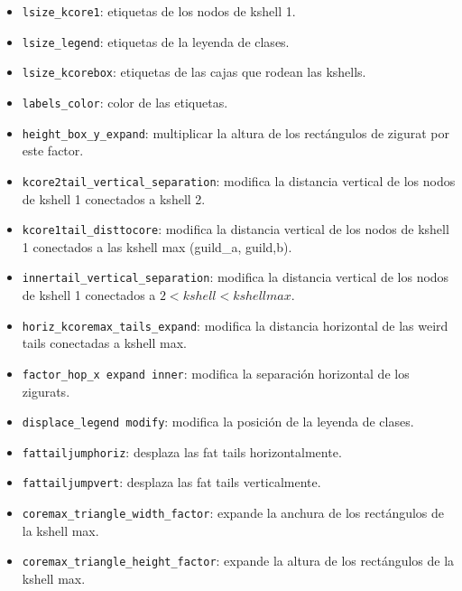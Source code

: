 \begin{itemize}
\item \texttt{lsize\_kcore1}: etiquetas de los nodos de kshell 1.

\item \texttt{lsize\_legend}: etiquetas de la leyenda de clases.

\item \texttt{lsize\_kcorebox}: etiquetas de las cajas que rodean las kshells.

\item \texttt{labels\_color}: color de las etiquetas.

\item \texttt{height\_box\_y\_expand}: multiplicar la altura de los rectángulos de zigurat por este factor.

\item \texttt{kcore2tail\_vertical\_separation}: modifica la distancia vertical de los nodos de kshell 1 conectados a kshell 2.

\item \texttt{kcore1tail\_disttocore}:  modifica la distancia vertical de los nodos de kshell 1 conectados a las kshell max (guild\_a, guild,b).

\item \texttt{innertail\_vertical\_separation}: modifica la distancia vertical de los nodos de kshell 1 conectados a $2 < kshell < kshell max$.

\item \texttt{horiz\_kcoremax\_tails\_expand}: modifica la distancia horizontal de las weird tails conectadas a kshell max.

\item \texttt{factor\_hop\_x expand inner}: modifica la separación horizontal de los zigurats.

\item \texttt{displace\_legend modify}: modifica la posición de la leyenda de clases.

\item \texttt{fattailjumphoriz}: desplaza las fat tails horizontalmente.

\item \texttt{fattailjumpvert}: desplaza las fat tails verticalmente.

\item \texttt{coremax\_triangle\_width\_factor}: expande la anchura de los rectángulos de la kshell max.

\item \texttt{coremax\_triangle\_height\_factor}: expande la altura de los rectángulos de la kshell max.


\end{itemize}
